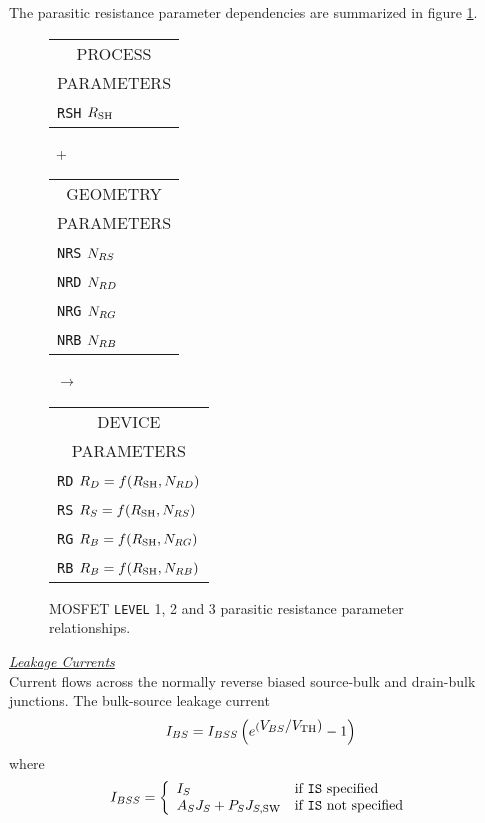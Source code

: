 {The parasitic resistance parameter dependencies are summarized in
figure \ref{m123para}.
\begin{figure}
\parbox[t]{1.3in}{
\begin{tabular}[t]{|p{1in}|}
\hline
\multicolumn{1}{|c|}{PROCESS} \\
\multicolumn{1}{|c|}{PARAMETERS} \\
\hline
\hline
{\tt RSH} \hfill $R_{\mbox{\scriptsize SH}}$\\
\hline
\end{tabular}
}
\hfill
\parbox{0.1in}{\ \vspace*{0.2in}\newline +}
\hfill
\begin{tabular}[t]{|p{1in}|}
\hline
\multicolumn{1}{|c|}{GEOMETRY} \\
\multicolumn{1}{|c|}{PARAMETERS} \\
\hline
{\tt NRS} \hfill $N_{RS}$\\
{\tt NRD} \hfill $N_{RD}$\\
{\tt NRG} \hfill $N_{RG}$\\
{\tt NRB} \hfill $N_{RB}$\\
\hline
\end{tabular}
\hfill
\parbox{0.1in}{\ \vspace*{0.2in}\newline $\rightarrow$}
\hfill
\begin{tabular}[t]{|p{1.8in}|}
\hline
\multicolumn{1}{|c|}{DEVICE} \\
\multicolumn{1}{|c|}{PARAMETERS} \\
\hline
{\tt RD} \hfill $R_D = f(R_{\mbox{\scriptsize SH}}, N_{RD})$ \\
{\tt RS} \hfill $R_S = f(R_{\mbox{\scriptsize SH}}, N_{RS})$ \\
{\tt RG} \hfill $R_B = f(R_{\mbox{\scriptsize SH}}, N_{RG})$ \\
{\tt RB} \hfill $R_B = f(R_{\mbox{\scriptsize SH}}, N_{RB})$ \\
\hline
\end{tabular}
\caption{MOSFET {\tt LEVEL} 1, 2 and 3 parasitic resistance parameter
relationships. \label{m123para}}
\end{figure}}

\noindent\underline{\sl Leakage Currents}\\[0.1in]
Current flows across the normally reverse biased source-bulk and drain-bulk
junctions.
The bulk-source leakage current
\begin{equation}
I_{BS} = I_{BSS}\left(e^{(\textstyle V_{BS}/V_{\mbox{\scriptsize TH}})} -1\right)
\label{eqn:m:ibs}
\end{equation}
where
\begin{equation}
I_{BSS} = \left\{ \begin{array}{ll}
         I_S       & \mbox{if {\tt IS} specified} \\
         A_S J_S + \PS\JSSW   & \mbox{if {\tt IS} not specified}
	 \end{array} \right. %
\end{equation}

